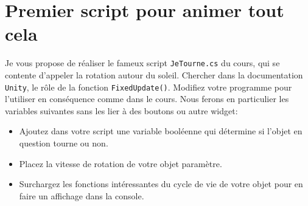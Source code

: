 \documentclass[a4paper,10pt]{article}
\begin{document}
\section{Premier script pour animer tout cela}

Je vous propose de réaliser le fameux script \lstinline|JeTourne.cs| du cours, qui se contente d'appeler la rotation autour du soleil. Chercher dans la documentation \texttt{Unity}, le rôle de la fonction \lstinline|FixedUpdate()|. Modifiez votre programme pour l'utiliser en conséquence comme dans le cours. Nous ferons en particulier les variables suivantes sans les lier à des boutons ou autre widget:
\begin{itemize}
	\item Ajoutez dans votre script une variable booléenne qui détermine si l'objet en question tourne ou non.
	\item Placez la vitesse de rotation de votre objet  paramètre.
	\item Surchargez les fonctions intéressantes du cycle de vie de votre objet pour en faire un affichage dans la console. 
\end{itemize}
\end{document}
